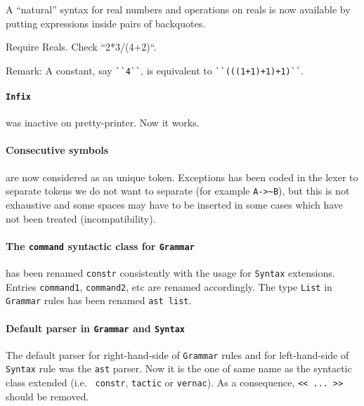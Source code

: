 \documentclass[11pt]{article}
\begin{document}
A ``natural'' syntax for real numbers and operations on reals is now
available by putting expressions inside pairs of backquotes.

\begin{coq_example}
Require Reals.
Check ``2*3/(4+2)``.
\end{coq_example}

Remark: A constant, say \verb:``4``:, is equivalent to
\verb:``(((1+1)+1)+1)``:.

\paragraph{{\tt Infix}} was inactive on pretty-printer. Now it works.

\paragraph{Consecutive symbols} are now considered as an unique token.
Exceptions has been coded in the lexer to separate tokens we do not want to
separate (for example \verb:A->~B:), but this is not exhaustive and some spaces
may have to be inserted in some cases which have not been treated
(incompatibility).


\paragraph{The {\tt command} syntactic class for {\tt Grammar}} has
been renamed {\tt constr} consistently with the usage for {\tt Syntax}
extensions. Entries {\tt command1}, {\tt command2}, etc are renamed
accordingly. The type {\tt List} in {\tt Grammar} rules has been
renamed {\tt ast list}.

\paragraph{Default parser in {\tt Grammar} and {\tt Syntax}}
\label{GrammarSyntax}

The default parser for right-hand-side of {\tt Grammar} rules and for
left-hand-side of {\tt Syntax} rule was the {\tt ast} parser.  Now it
is the one of same name as the syntactic class extended (i.e. {\tt
constr}, {\tt tactic} or {\tt vernac}). As a consequence, 
{\verb:<< ... >>:} should be removed.
\end{document}
